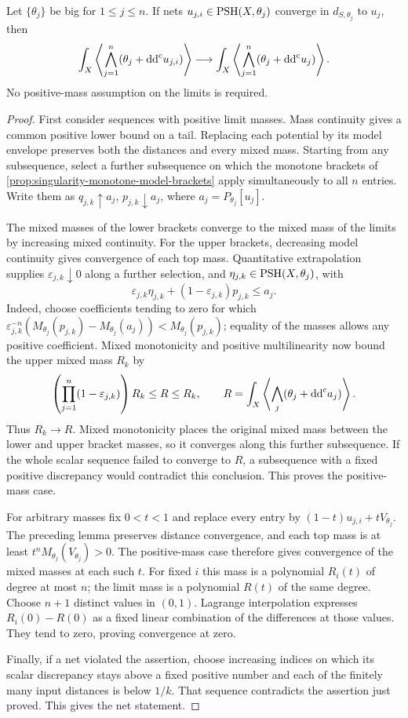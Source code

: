\begin{theorem}\label{thm:singularity-mixed-mass-continuity}
Let $\{\theta_j\}$ be big for $1\leq j\leq n$. If nets $u_{j,i}\in\mathrm{PSH}(X,\theta_j)$ converge in $d_{S,\theta_j}$ to $u_j$, then
\[
 \int_X\left\langle\bigwedge_{j=1}^n(\theta_j+\mathrm{dd}^{\mathrm{c}} u_{j,i})\right\rangle
 \longrightarrow
 \int_X\left\langle\bigwedge_{j=1}^n(\theta_j+\mathrm{dd}^{\mathrm{c}} u_j)\right\rangle.
\]
No positive-mass assumption on the limits is required.
\end{theorem}
\begin{proof}
First consider sequences with positive limit masses. Mass continuity gives a common positive lower bound on a tail. Replacing each potential by its model envelope preserves both the distances and every mixed mass. Starting from any subsequence, select a further subsequence on which the monotone brackets of \cref{prop:singularity-monotone-model-brackets} apply simultaneously to all $n$ entries. Write them as $q_{j,k}\uparrow a_j$, $p_{j,k}\downarrow a_j$, where $a_j=P_{\theta_j}[u_j]$.

The mixed masses of the lower brackets converge to the mixed mass of the limits by increasing mixed continuity. For the upper brackets, decreasing model continuity gives convergence of each top mass. Quantitative extrapolation supplies $\varepsilon_{j,k}\downarrow0$ along a further selection, and $\eta_{j,k}\in\mathrm{PSH}(X,\theta_j)$, with
\[
 \varepsilon_{j,k}\eta_{j,k}+(1-\varepsilon_{j,k})p_{j,k}\leq a_j.
\]
Indeed, choose coefficients tending to zero for which
$\varepsilon_{j,k}^{-n}(M_{\theta_j}(p_{j,k})-M_{\theta_j}(a_j))<M_{\theta_j}(p_{j,k})$; equality of the masses allows any positive coefficient. Mixed monotonicity and positive multilinearity now bound the upper mixed mass $R_k$ by
\[
 \left(\prod_{j=1}^n(1-\varepsilon_{j,k})\right)R_k
       \leq R\leq R_k,
 \qquad
 R=\int_X\left\langle\bigwedge_j(\theta_j+\mathrm{dd}^{\mathrm{c}} a_j)\right\rangle.
\]
Thus $R_k\to R$. Mixed monotonicity places the original mixed mass between the lower and upper bracket masses, so it converges along this further subsequence. If the whole scalar sequence failed to converge to $R$, a subsequence with a fixed positive discrepancy would contradict this conclusion. This proves the positive-mass case.

For arbitrary masses fix $0<t<1$ and replace every entry by
$(1-t)u_{j,i}+tV_{\theta_j}$. The preceding lemma preserves distance convergence, and each top mass is at least $t^nM_{\theta_j}(V_{\theta_j})>0$. The positive-mass case therefore gives convergence of the mixed masses at each such $t$. For fixed $i$ this mass is a polynomial $R_i(t)$ of degree at most $n$; the limit mass is a polynomial $R(t)$ of the same degree. Choose $n+1$ distinct values in $(0,1)$. Lagrange interpolation expresses $R_i(0)-R(0)$ as a fixed linear combination of the differences at those values. They tend to zero, proving convergence at zero.

Finally, if a net violated the assertion, choose increasing indices on which its scalar discrepancy stays above a fixed positive number and each of the finitely many input distances is below $1/k$. That sequence contradicts the assertion just proved. This gives the net statement.
\end{proof}
